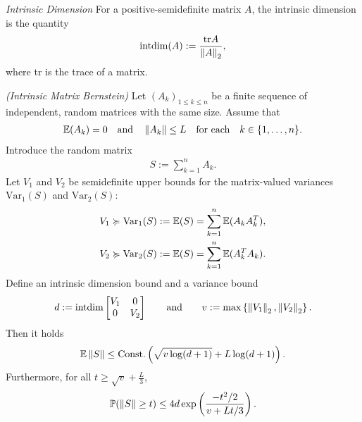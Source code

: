 \begin{definition}
  \emph{Intrinsic Dimension}
  For a positive-semidefinite matrix $A$,
  the intrinsic dimension is the quantity
  \begin{gather*}
    \text{intdim}
    (A)
    :=
    \frac{\text{tr}A}{\left\lVert A\right\rVert_2}
    ,
  \end{gather*}
  where tr is the trace of a matrix.
\end{definition}
\begin{theorem}
  \emph{(Intrinsic Matrix Bernstein)}
  \label{rmineq_bernstein}
  Let $(A_k)_{1\le k \le n}$  be a finite sequence of independent, random matrices with the same size. Assume that
    \begin{gather}
      \mathbb{E}(A_k)=0\quad\text{and}\quad\left\lVert A_k\right\rVert\le L \quad \text{for each}\quad  k\in \{1,\ldots,n\}.
    \end{gather}
  Introduce the random matrix
      \begin{gather*}
        S:=\sum_{k=1}^n A_k.
      \end{gather*}
  Let 
  $V_1$ 
  and
  $V_2$ 
  be semidefinite upper bounds for the matrix-valued variances
  $\text{Var}_1(S)$
  and
  $\text{Var}_2(S)$:
  \begin{align*}
    V_1 
    &\succcurlyeq 
    \text{Var}_1(S)
    :=
    \mathbb{E}(S)
    =
    \sum_{k = 1}^{n}
    \mathbb{E}(A_k A_k^T),\\
    V_2 
    &\succcurlyeq 
    \text{Var}_2(S)
    :=
    \mathbb{E}(S)
    =
    \sum_{k = 1}^{n}
    \mathbb{E}(A_k^T A_k)
    .
  \end{align*}
  Define an intrinsic dimension bound and a variance bound
  \begin{gather}
    \label{ rmineq_intrinsic_bernstein_intdim_var_bound }
    d
    :=
    \text{intdim}
    \begin{bmatrix}
      V_1 & 0 \\
      0   & V_2
    \end{bmatrix}
    \qquad
    \text{and}
    \qquad
    v
    :=
    \max
    \left\{ \left\lVert V_1\right\rVert_2, \left\lVert V_2\right\rVert_2 \right\}
    .
  \end{gather}
  Then 
  it holds
      \begin{align}
        \label{rmineq_intrinsic_bernstein_expectation_bound}
        \mathbb{E}\left\lVert S\right\rVert\le \text{Const.}\left( \sqrt{v\log(d+1)} + L\log(d+1) \right).
      \end{align}
    Furthermore, for all 
  $
    t
    \ge
    \sqrt{v}
    +
    \frac{L}{3}
  $,
      \begin{gather}
        \label{rmineq_intrinsic_bernstein_probability_bound}
        \mathbb{P}(\left\lVert S\right\rVert\ge t)\le 4d \exp\left(\frac{-t^2/2}{v+Lt/3} \right).
      \end{gather}
\end{theorem}

